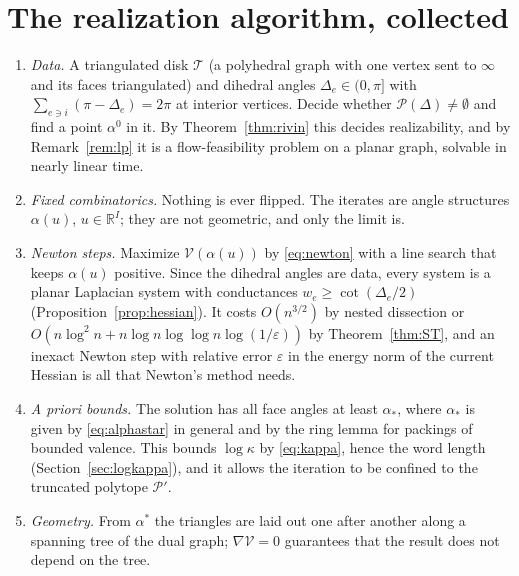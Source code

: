 \documentclass[11pt]{amsart}
\theoremstyle{definition}
\theoremstyle{remark}
\newcommand{\R}{\mathbb{R}}
\newcommand{\cT}{\mathcal{T}}
\newcommand{\eps}{\varepsilon}
\begin{document}
\section{The realization algorithm, collected}\label{sec:algo}

\begin{enumerate}[leftmargin=*,itemsep=3pt]
\item \emph{Data.} A triangulated disk $\cT$ (a polyhedral graph with one vertex sent to $\infty$ and its faces triangulated) and dihedral angles $\Delta_e\in(0,\pi]$ with $\sum_{e\ni i}(\pi-\Delta_e)=2\pi$ at interior vertices. Decide whether $\mathcal P(\Delta)\ne\emptyset$ and find a point $\alpha^0$ in it. By Theorem~\ref{thm:rivin} this decides realizability, and by Remark~\ref{rem:lp} it is a flow-feasibility problem on a planar graph, solvable in nearly linear time.
\item \emph{Fixed combinatorics.} Nothing is ever flipped. The iterates are angle structures $\alpha(u)$, $u\in\R^I$; they are not geometric, and only the limit is.
\item \emph{Newton steps.} Maximize $\mathcal V(\alpha(u))$ by \eqref{eq:newton} with a line search that keeps $\alpha(u)$ positive. Since the dihedral angles are data, every system is a planar Laplacian system with conductances $w_e\ge\cot(\Delta_e/2)$ (Proposition~\ref{prop:hessian}).
It costs $O(n^{3/2})$ by nested dissection or $O(n\log^2n+n\log n\log\log n\log(1/\eps))$ by Theorem~\ref{thm:ST}, and an inexact Newton step with relative error $\eps$ in the energy norm of the current Hessian is all that Newton's method needs.
\item \emph{A priori bounds.} The solution has all face angles at least $\alpha_*$, where $\alpha_*$ is given by \eqref{eq:alphastar} in general and by the ring lemma for packings of bounded valence. This bounds $\log\kappa$ by \eqref{eq:kappa}, hence the word length (Section~\ref{sec:logkappa}), and it allows the iteration to be confined to the truncated polytope $\mathcal P'$.
\item \emph{Geometry.} From $\alpha^*$ the triangles are laid out one after another along a spanning tree of the dual graph; $\nabla\mathcal V=0$ guarantees that the result does not depend on the tree.
\end{enumerate}
\end{document}
